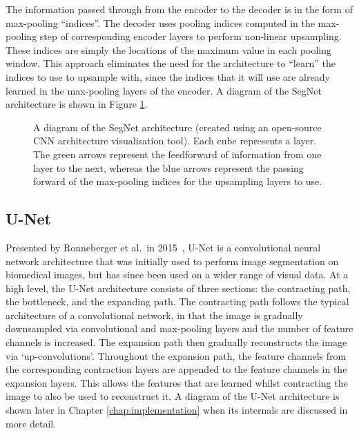 
The information passed through from the encoder to the decoder is in the form of max-pooling ``indices''. The decoder uses pooling indices computed in the max-pooling step of corresponding encoder layers to perform non-linear upsampling. These indices are simply the locations of the maximum value in each pooling window. This approach eliminates the need for the architecture to ``learn'' the indices to use to upsample with, since the indices that it will use are already learned in the max-pooling layers of the encoder. A diagram of the SegNet architecture is shown in Figure \ref{fig:segnet}.

\begin{figure}[t]
    \centering
    \hspace*{-0.3cm}
    
    \caption[A diagram of the SegNet architecture (created using an open-source CNN architecture visualisation tool). Each cube represents a layer. The green arrows represent the feedforward of information from one layer to the next, whereas the blue arrows represent the passing forward of the max-pooling indices for the upsampling layers to use.]{A diagram of the SegNet architecture (created using an open-source CNN architecture visualisation tool\footnotemark). Each cube represents a layer. The green arrows represent the feedforward of information from one layer to the next, whereas the blue arrows represent the passing forward of the max-pooling indices for the upsampling layers to use.}
    \label{fig:segnet}
\end{figure}

\subsection{U-Net}

Presented by Ronneberger et al.\ in 2015~\cite{ronneberger2015u}, U-Net is a convolutional neural network architecture that was initially used to perform image segmentation on biomedical images, but has since been used on a wider range of visual data. At a high level, the U-Net architecture consists of three sections: the contracting path, the bottleneck, and the expanding path. The contracting path follows the typical architecture of a convolutional network, in that the image is gradually downsampled via convolutional and max-pooling layers and the number of feature channels is increased. The expansion path then gradually reconstructs the image via `up-convolutions'. Throughout the expansion path, the feature channels from the corresponding contraction layers are appended to the feature channels in the expansion layers. This allows the features that are learned whilst contracting the image to also be used to reconstruct it. A diagram of the U-Net architecture is shown later in Chapter \ref{chap:implementation} when its internals are discussed in more detail.

